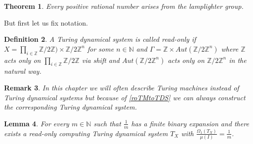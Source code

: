 \documentclass[12pt,a4paper]{scrartcl}
\newtheorem{Theorem}{Theorem}[section]
\newtheorem{Definition}[Theorem]{Definition}
\newtheorem{Lemma}[Theorem]{Lemma}
\newtheorem{Remark}[Theorem]{Remark}
\numberwithin{equation}{section}
\newcommand{\Z}{\mathbb{Z}} %
\newcommand{\N}{\mathbb{N}} %
\newcommand{\2}{\mathbb{Z} / 2 \mathbb{Z}}
\newcommand{\1}{\overline{1}}
\newcommand{\0}{\overline{0}}
\begin{document}
\begin{Theorem}
	Every positive rational number arises from the lamplighter group.
\end{Theorem}
But first let us fix notation.
\begin{Definition}
	A Turing dynamical system is called read-only if $X = \prod_{i \in \Z} \2) \times \2^n$ for some $n \in \N$ and $\Gamma = \Z \times Aut(\2^n)$ where $\Z$  acts only on $\prod_{i \in \Z} \2$ via shift and $Aut(\2^n)$ acts only on $\2^n$ in the natural way.
\end{Definition}
\begin{Remark}
	In this chapter we will often describe Turing machines instead of Turing dynamical systems but because of \ref{roTMtoTDS} we can always construct the corresponding Turing dynamical system.
\end{Remark}
\begin{Lemma}
	For every $m \in \N$ such that $\frac{1}{m}$ has a finite binary expansion and there exists a read-only computing Turing dynamical system $T_X$ with $\frac{\Omega_1(T_X)}{\mu(I)} = \frac{1}{m}$.
\end{Lemma}
\end{document}
